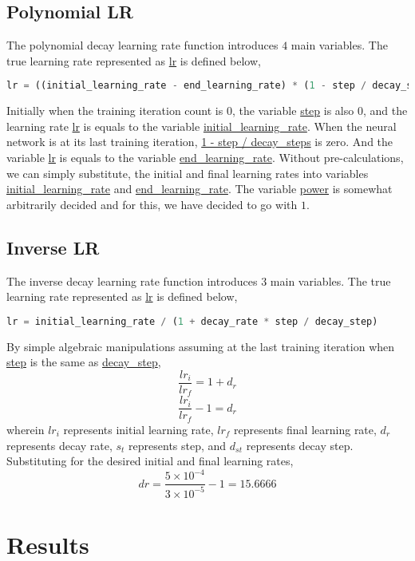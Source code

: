 \documentclass[a4paper, 12pt]{report}
\begin{document}
\begin{center}
\subsection{Polynomial LR}
\begin{comment}
\end{comment}
The polynomial decay learning rate function introduces $4$ main variables. The true learning rate represented as \url{lr} is defined below,
\begin{lstlisting}[language=python]
lr = ((initial_learning_rate - end_learning_rate) * (1 - step / decay_steps) ^ (power)) + end_learning_rate
\end{lstlisting}
Initially when the training iteration count is $0$, the variable \url{step} is also $0$, and the learning rate \url{lr} is equals to the variable \url{initial_learning_rate}. When the neural network is at its last training iteration, \url{1 - step / decay_steps} is zero. And the variable \url{lr} is equals to the variable \url{end_learning_rate}. Without pre-calculations, we can simply substitute, the initial and final learning rates into variables \url{initial_learning_rate} and \url{end_learning_rate}. The variable \url{power} is somewhat arbitrarily decided and for this, we have decided to go with $1$.
\subsection{Inverse LR}
\begin{comment}
\end{comment}
The inverse decay learning rate function introduces $3$ main variables. The true learning rate represented as \url{lr} is defined below,
\begin{lstlisting}[language=python]
lr = initial_learning_rate / (1 + decay_rate * step / decay_step)
\end{lstlisting}
By simple algebraic manipulations assuming at the last training iteration when \url{step} is the same as \url{decay_step},
$$\frac{lr_{i}}{lr_{f}} = 1 + d_{r}$$
$$\frac{lr_{i}}{lr_{f}} - 1 = d_{r}$$
wherein $lr_{i}$ represents initial learning rate, $lr_{f}$ represents final learning rate, $d_{r}$ represents decay rate, $s_{t}$ represents step, and $d_{st}$ represents decay step. Substituting for the desired initial and final learning rates, 
$$dr = \frac{5\times10^{-4}}{3\times10^{-5}} - 1 = 15.6666$$
\section{Results}
\begin{comment}
\end{comment}

\end{center}
\end{document}

